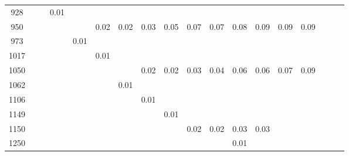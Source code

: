\begin{table}[ht!]
{\begin{tabular}{c|ccccccccccccccccc}
    928 &  &  & 0.01 &  &  &  &  &  &  &  &  &  &  &  \\
    950 &  &  &  &  & 0.02 & 0.02 & 0.03 & 0.05 & 0.07 & 0.07 & 0.08 & 0.09 & 0.09 & 0.09 \\
    973 &  &  &  & 0.01 &  &  &  &  &  &  &  &  &  &  \\
    1017 &  &  &  &  & 0.01 &  &  &  &  &  &  &  &  &  \\
    1050 &  &  &  &  &  &  & 0.02 & 0.02 & 0.03 & 0.04 & 0.06 & 0.06 & 0.07 & 0.09 \\
    1062 &  &  &  &  &  & 0.01 &  &  &  &  &  &  &  &  \\
    1106 &  &  &  &  &  &  & 0.01 &  &  &  &  &  &  &  \\
    1149 &  &  &  &  &  &  &  & 0.01 &  &  &  &  &  &  \\
    1150 &  &  &  &  &  &  &  &  & 0.02 & 0.02 & 0.03 & 0.03 &  &  \\
    1250 &  &  &  &  &  &  &  &  &  &  & 0.01 &  &  &  \\
    \hline \hline
  \end{tabular}
  }
\end{table}

